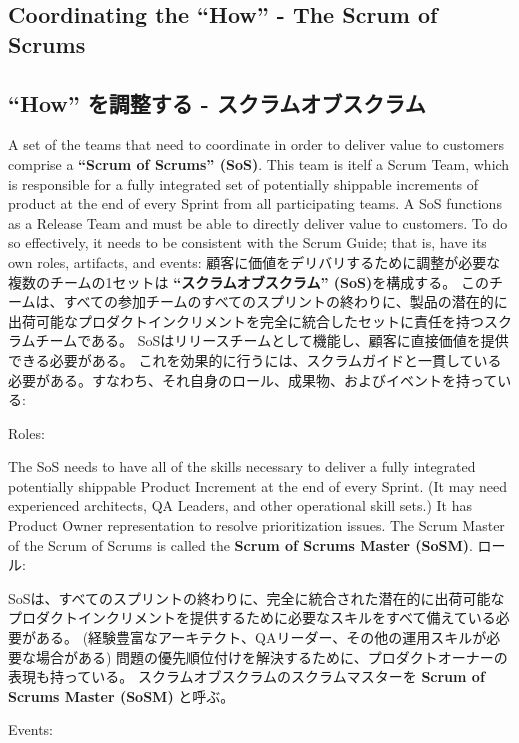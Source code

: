 \documentclass[12pt,a4paper,parskip=full]{scrartcl}
\begin{document}
\subsection{Coordinating the ``How'' - The Scrum of Scrums}
\fi
\subsection{``How'' を調整する - スクラムオブスクラム}
A set of the teams that need to coordinate in order to deliver value to customers comprise a \textbf{``Scrum of Scrums'' (SoS)}. This team is itelf a Scrum Team, which is responsible for a fully integrated set of potentially shippable increments of product at the end of every Sprint from all participating teams. A SoS functions as a Release Team and must be able to directly deliver value to customers. To do so effectively, it needs to be consistent with the Scrum Guide; that is, have its own roles, artifacts, and events:
\fi
顧客に価値をデリバリするために調整が必要な複数のチームの1セットは \textbf{``スクラムオブスクラム'' (SoS)}を構成する。
このチームは、すべての参加チームのすべてのスプリントの終わりに、製品の潜在的に出荷可能なプロダクトインクリメントを完全に統合したセットに責任を持つスクラムチームである。
SoSはリリースチームとして機能し、顧客に直接価値を提供できる必要がある。
これを効果的に行うには、スクラムガイドと一貫している必要がある。すなわち、それ自身のロール、成果物、およびイベントを持っている:

Roles:

The SoS needs to have all of the skills necessary to deliver a fully integrated potentially shippable Product Increment at the end of every Sprint. (It may need experienced architects, QA Leaders, and other operational skill sets.) It has Product Owner representation to resolve prioritization issues.
The Scrum Master of the Scrum of Scrums is called the \textbf{Scrum of Scrums Master (SoSM)}.
\fi
ロール:

SoSは、すべてのスプリントの終わりに、完全に統合された潜在的に出荷可能なプロダクトインクリメントを提供するために必要なスキルをすべて備えている必要がある。
(経験豊富なアーキテクト、QAリーダー、その他の運用スキルが必要な場合がある)
問題の優先順位付けを解決するために、プロダクトオーナーの表現も持っている。
スクラムオブスクラムのスクラムマスターを \textbf{Scrum of Scrums Master (SoSM)} と呼ぶ。

Events:
\end{document}
